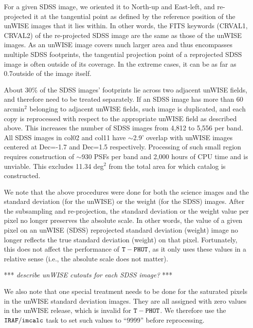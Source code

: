 \documentclass[apj,iop]{emulateapj}
\begin{document}
For a given SDSS image, we oriented it to North-up and East-left, and re-projected it at the tangential point as defined by the reference position of the unWISE images that it lies within. In other words, the FITS keywords (CRVAL1, CRVAL2) of the re-projected SDSS image are the same as those of the unWISE images. As an unWISE image covers much larger area and thus encompasses multiple SDSS footprints, the tangential projection point of a reprojected SDSS image is often outside of its coverage. In the extreme cases, it can be as far as 0.7\degree outside of the image itself.

About 30\% of the SDSS images' footprints lie across two adjacent unWISE fields, and therefore need to be treated separately. If an SDSS image has more than 60 arcmin$^2$ belonging to adjacent unWISE fields, such image is duplicated, and each copy is reprocessed with respect to the appropriate unWISE field as described above. This increases the number of SDSS images from 4,812 to 5,556 per band. All SDSS images in col02 and col11 have $\sim$2.9' overlap with unWISE images centered at Dec=-1.7 and Dec=1.5 respectively. Processing of such small region requires construction of $\sim$930 PSFs per band and 2,000 hours of CPU time and is unviable. This excludes 11.34 deg$^2$ from the total area for which catalog is constructed.

We note that the above procedures were done for both the science images and the standard deviation (for the unWISE) or the weight (for the SDSS) images. After the subsampling and re-projection, the standard deviation or the weight value per pixel no longer preserves the absolute scale. In other words, the value of a given pixel on an unWISE (SDSS) reprojected standard deviation (weight) image no longer reflects the true standard deviation (weight) on that pixel. Fortunately, this does not affect the performance of $\tt T-PHOT$, as it only uses these values in a relative sense (i.e., the absolute scale does not matter). 

***
{\it describe unWISE cutouts for each SDSS image?}
***

We also note that one special treatment needs to be done for the saturated pixels in the unWISE standard deviation images. They are all assigned with zero values in the unWISE release, which is invalid for $\tt T-PHOT$. We therefore use the $\tt IRAF/imcalc$ task to set such values to “9999” before reprocessing.
    
\end{document}
